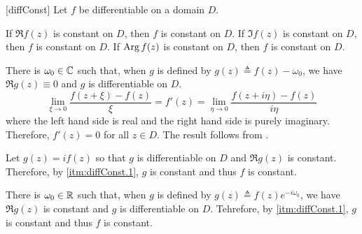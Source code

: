 \documentclass[../complex_variables_1.tex]{subfiles}
\begin{document}
\begin{Corollary}{}[diffConst]
    Let \(f\) be differentiable on a domain \(D\).
    \begin{enumerate}[label=(\arabic*), ref=\protect{\Cref{cor:diffConst} (\arabic*)}]
        \ii\label{itm:diffConst.1}
        If \(\Re f(z)\) is constant on \(D\), then \(f\) is constant on \(D\).
        \ii\label{itm:diffConst.2}
        If \(\Im f(z)\) is constant on \(D\), then \(f\) is constant on \(D\).
        \ii\label{itm:diffConst.3}
        If \(\operatorname{Arg} f(z)\) is constant on \(D\), then \(f\) is constant on \(D\).
    \end{enumerate}
\end{Corollary}
\begin{myproof}[Proof]\hfill
\begin{enumerate}[label=(\arabic*)]
    \ii
    There is \(\omega_0 \in \CC\) such that, when \(g\) is defined by \(g(z) \triangleq f(z) -
    \omega_0\), we have \(\Re g(z) \equiv 0\) and \(g\) is differentiable on \(D\).
    \[
        \lim_{\xi \to 0} \frac{f(z + \xi) - f(z)}{\xi} = f'(z)
        = \lim_{\eta \to 0} \frac{f(z + i\eta) - f(z)}{i\eta}
    \]
    where the left hand side is real and the right hand side is purely imaginary.
    Therefore, \(f'(z) = 0\) for all \(z \in D\).
    The result follows from .

    \ii
    Let \(g(z) = if(z)\) so that \(g\) is differentiable on \(D\) and \(\Re g(z)\) is constant.
    Therefore, by \ref{itm:diffConst.1}, \(g\) is constant and thus \(f\) is constant.

    \ii
    There is \(\omega_0 \in \RR\) such that, when \(g\) is defined by \(g(z) \triangleq f(z)e^{-i\omega_0}\),
    we have \(\Re g(z)\) is constant and \(g\) is differentiable on \(D\).
    Tehrefore, by \ref{itm:diffConst.1}, \(g\) is constant and thus \(f\) is constant.
    \qedhere
\end{enumerate}
\end{myproof}
\end{document}
